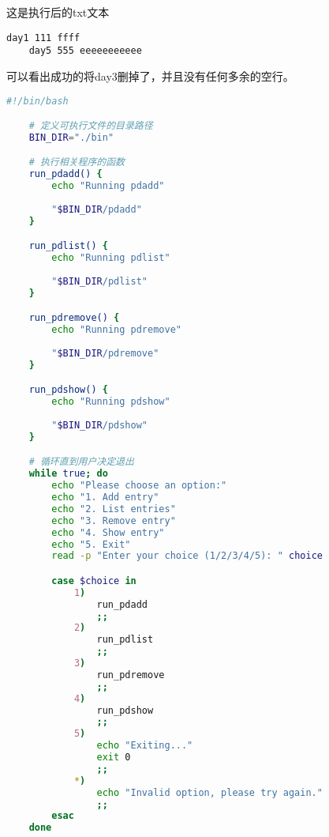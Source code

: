 \documentclass{ctexart} %
\begin{document}
这是执行后的txt文本
\begin{lstlisting}[caption={My Text}, captionpos=b]
    day1 111 ffff
    day5 555 eeeeeeeeeee
\end{lstlisting}
可以看出成功的将day3删掉了，并且没有任何多余的空行。

\vspace{10pt}
\vspace{10pt}

\begin{lstlisting}[language = bash, captionpos=b, caption = 最终脚本]
    #!/bin/bash

    # 定义可执行文件的目录路径
    BIN_DIR="./bin"

    # 执行相关程序的函数
    run_pdadd() {
        echo "Running pdadd"
        
        "$BIN_DIR/pdadd"
    }

    run_pdlist() {
        echo "Running pdlist"
        
        "$BIN_DIR/pdlist"
    }

    run_pdremove() {
        echo "Running pdremove"
        
        "$BIN_DIR/pdremove"
    }

    run_pdshow() {
        echo "Running pdshow"
        
        "$BIN_DIR/pdshow"
    }

    # 循环直到用户决定退出
    while true; do
        echo "Please choose an option:"
        echo "1. Add entry"
        echo "2. List entries"
        echo "3. Remove entry"
        echo "4. Show entry"
        echo "5. Exit"
        read -p "Enter your choice (1/2/3/4/5): " choice

        case $choice in
            1)
                run_pdadd
                ;;
            2)
                run_pdlist
                ;;
            3)
                run_pdremove
                ;;
            4)
                run_pdshow
                ;;
            5)
                echo "Exiting..."
                exit 0
                ;;
            *)
                echo "Invalid option, please try again."
                ;;
        esac
    done

\end{lstlisting}
\end{document}
